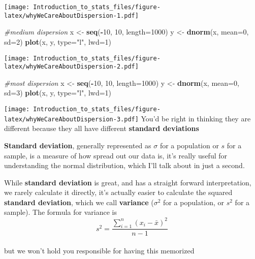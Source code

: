 \documentclass[
]{article}
\newenvironment{Shaded}{\begin{snugshade}}{\end{snugshade}}
\newcommand{\CommentTok}[1]{\textcolor[rgb]{0.56,0.35,0.01}{\textit{#1}}}
\newcommand{\DataTypeTok}[1]{\textcolor[rgb]{0.13,0.29,0.53}{#1}}
\newcommand{\DecValTok}[1]{\textcolor[rgb]{0.00,0.00,0.81}{#1}}
\newcommand{\KeywordTok}[1]{\textcolor[rgb]{0.13,0.29,0.53}{\textbf{#1}}}
\newcommand{\NormalTok}[1]{#1}
\newcommand{\OperatorTok}[1]{\textcolor[rgb]{0.81,0.36,0.00}{\textbf{#1}}}
\newcommand{\StringTok}[1]{\textcolor[rgb]{0.31,0.60,0.02}{#1}}
\begin{document}
\texttt{[image: Introduction\_to\_stats\_files/figure-latex/whyWeCareAboutDispersion-1.pdf]}

\begin{Shaded}
\begin{Highlighting}[]
\CommentTok{\#medium dispersion}
\NormalTok{x \textless{}{-}}\StringTok{ }\KeywordTok{seq}\NormalTok{(}\OperatorTok{{-}}\DecValTok{10}\NormalTok{, }\DecValTok{10}\NormalTok{, }\DataTypeTok{length=}\DecValTok{1000}\NormalTok{)}
\NormalTok{y \textless{}{-}}\StringTok{ }\KeywordTok{dnorm}\NormalTok{(x, }\DataTypeTok{mean=}\DecValTok{0}\NormalTok{, }\DataTypeTok{sd=}\DecValTok{2}\NormalTok{)}
\KeywordTok{plot}\NormalTok{(x, y, }\DataTypeTok{type=}\StringTok{"l"}\NormalTok{, }\DataTypeTok{lwd=}\DecValTok{1}\NormalTok{)}
\end{Highlighting}
\end{Shaded}

\texttt{[image: Introduction\_to\_stats\_files/figure-latex/whyWeCareAboutDispersion-2.pdf]}

\begin{Shaded}
\begin{Highlighting}[]
\CommentTok{\#most dispersion}
\NormalTok{x \textless{}{-}}\StringTok{ }\KeywordTok{seq}\NormalTok{(}\OperatorTok{{-}}\DecValTok{10}\NormalTok{, }\DecValTok{10}\NormalTok{, }\DataTypeTok{length=}\DecValTok{1000}\NormalTok{)}
\NormalTok{y \textless{}{-}}\StringTok{ }\KeywordTok{dnorm}\NormalTok{(x, }\DataTypeTok{mean=}\DecValTok{0}\NormalTok{, }\DataTypeTok{sd=}\DecValTok{3}\NormalTok{)}
\KeywordTok{plot}\NormalTok{(x, y, }\DataTypeTok{type=}\StringTok{"l"}\NormalTok{, }\DataTypeTok{lwd=}\DecValTok{1}\NormalTok{)}
\end{Highlighting}
\end{Shaded}

\texttt{[image: Introduction\_to\_stats\_files/figure-latex/whyWeCareAboutDispersion-3.pdf]}
You'd be right in thinking they are different because they all have
different \textbf{standard deviations}

\textbf{Standard deviation}, generally represented as \(\sigma\) for a
population or \(s\) for a sample, is a measure of how spread out our
data is, it's really useful for understanding the normal distribution,
which I'll talk about in just a second.

While \textbf{standard deviation} is great, and has a straight forward
interpretation, we rarely calculate it directly, it's actually easier to
calculate the squared \textbf{standard deviation}, which we call
\textbf{variance} (\(\sigma^2\) for a population, or \(s^2\) for a
sample). The formula for variance is
\[s^2=\frac{\sum_{i=1}^{n}(x_i-\bar{x})^2}{n-1}\]\\
but we won't hold you responsible for having this memorized
\end{document}
